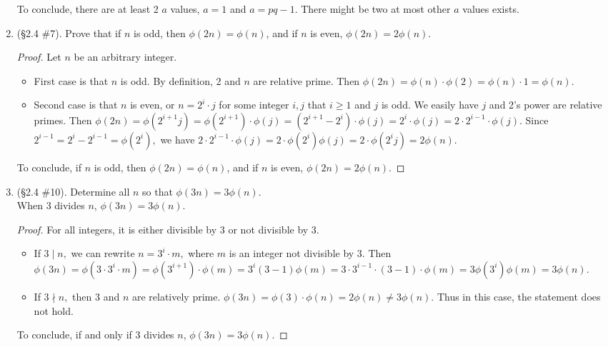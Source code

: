 \documentclass[11pt,a4paper]{article}
\begin{document}
\begin{enumerate}
	To conclude, there are at least 2 $a$ values, $a=1$ and $a=pq-1.$ There might be two at most other $a$ values exists.

	\item (\S 2.4 \#7). Prove that if \(n\) is odd, then \(\phi(2n) = \phi(n)\), and if \(n\) is even,  \(\phi(2n)=2\phi(n)\).

		\begin{proof} Let $n$ be an arbitrary integer.
			\begin{itemize}
				\item First case is that $n$ is odd. By definition, 2 and $n$ are relative prime. Then \(\phi(2n) = \phi(n) \cdot \phi(2) = \phi(n) \cdot 1 = \phi(n).\)
				\item Second case is that $n$ is even, or $n = 2^i \cdot j$ for some integer $i,j$ that $i\geq 1$ and $j$ is odd. We easily have $j$ and 2's power are relative primes. Then \(\phi(2n)=\phi(2^{i+1}j) = \phi(2^{i+1}) \cdot \phi(j) = (2^{i+1} - 2^i)\cdot \phi(j) = 2^i \cdot \phi(j) = 2\cdot 2^{i-1} \cdot \phi(j).\) Since $2^{i-1} = 2^i - 2^{i-1} = \phi(2^i),$ we have \(2\cdot 2^{i-1} \cdot \phi(j) = 2 \cdot \phi(2^i) \phi (j) = 2 \cdot \phi(2^ij) = 2 \phi(n).\)
			\end{itemize}
			To conclude, if \(n\) is odd, then \(\phi(2n) = \phi(n)\), and if \(n\) is even,  \(\phi(2n)=2\phi(n)\).
		\end{proof}

	\item (\S 2.4 \#10). Determine all \(n\) so that \(\phi(3n)=3\phi(n)\).\\

	When 3 divides $n$, \(\phi(3n)=3\phi(n)\).
	\begin{proof}
		For all integers, it is either divisible by 3 or not divisible by 3.
		\begin{itemize}
			\item If $3 \mid n,$ we can rewrite $n = 3^i \cdot m,$ where $m$ is an integer not divisible by 3. Then \(\phi(3n)=\phi(3\cdot 3^i \cdot m) = \phi(3^{i+1})\cdot \phi(m) = 3^i(3-1)\phi(m) = 3 \cdot 3^{i-1} \cdot (3-1) \cdot \phi(m) = 3\phi(3^i)\phi(m) = 3\phi(n).\)
			\item If $3 \nmid n,$ then 3 and $n$ are relatively prime. \(\phi(3n)=\phi(3)\cdot \phi(n) = 2\phi(n) \neq 3\phi(n).\) Thus in this case, the statement does not hold.
		\end{itemize}
		To conclude, if and only if 3 divides $n$, \(\phi(3n)=3\phi(n)\).
	\end{proof}


\end{enumerate}
\end{document}

